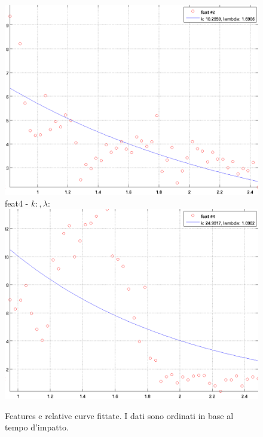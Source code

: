 \documentclass[12pt]{report}
\begin{document}
\begin{figure}[H]
\begin{minipage}[t]{0.5\linewidth}
	\includegraphics[scale=\imFeat]{images/feat2}\\
	feat4 - $k: , \lambda:  $\\
	\includegraphics[scale=\imFeat]{images/feat4}\\
\end{minipage}
\caption[short]{Features e relative curve fittate. I dati sono ordinati in base al tempo d'impatto.}
\label{fig:feats1}
\end{figure}
\end{document}
